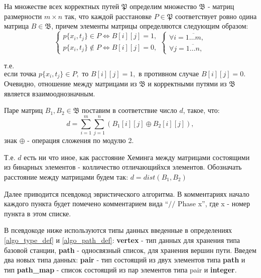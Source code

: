 \begin{mydef} \label{path}
	На множестве всех корректных путей $\mathfrak{P}$ определим множество $\mathfrak{B}$ - матриц размерности $m \times n$ так, что 
каждой расстановке $P \in \mathfrak{P}$ соответствует ровно одина матрица $B \in \mathfrak{B}$, причем элементы матрицы определяются следующим образом:
\begin{equation}
	\begin{cases}	
	p\{x_{i}, t_{j}\} \in P  \Leftrightarrow  B[i][j] = 1, \\
	p\{x_{i}, t_{j}\} \notin P  \Leftrightarrow  B[i][j] = 0,
	\end{cases}
	\begin{cases}	
		\forall i = \overline{1 \dots m},\\
		\forall j = \overline{1 \dots n},
	\end{cases}
\end{equation}

\end{mydef}
т.е. $\text{если точка } p\{x_{i}, t_{j}\} \in P, \text{ то } B[i][j] = 1, \text{ в противном случае } B[i][j] = 0.$ Очевидно, отношение между матрицами из $\mathfrak{B}$ и корректными путями из $\mathfrak{B}$ является взаимооднозначным.

\begin{mydef} \label{path_distance}
	Паре матриц $B_{1}, B_{2} \in \mathfrak{B}$ поставим в соответствие число $d$, такое, что: 
	\begin{equation}
		d = \sum_{i = 1}^{m}\sum_{j = 1}^{n}(B_{1}[i][j] \oplus B_{2}[i][j]),
	\end{equation}
	знак $\oplus$ - операция сложения по модулю 2.
\end{mydef}
Т.е. $d$ есть ни что иное, как расстояние Хеминга между матрицами состоящими из бинарных элементов - колличество отличающийхся элементов. Обозначать расстояние между матрицами будем так:
$d =dist(B_{1}, B_{2})$

Далее приводится псевдокод эвристического алгоритма.
В комментариях начало каждого пункта будет помечено комментарием вида ``$\slash\slash$ \textcolor{commentcolor}{Phase x}'', где x - номер пункта в этом списке.


В псевдокоде ниже используются типы данных введенные в определениях \ref{algo_type_def} и \ref{algo_path_def}: \textbf{vertex} - тип данных для хранения типа базовой станции, \textbf{path} - односвязный список, для хранения вершин пути.
Введем два новых типа данных: \textbf{pair} - тип состоящий из двух элементов типа \textbf{path} и тип \textbf{path\_map} - список состоящий из пар элементов типа pair и \textbf{integer}.


